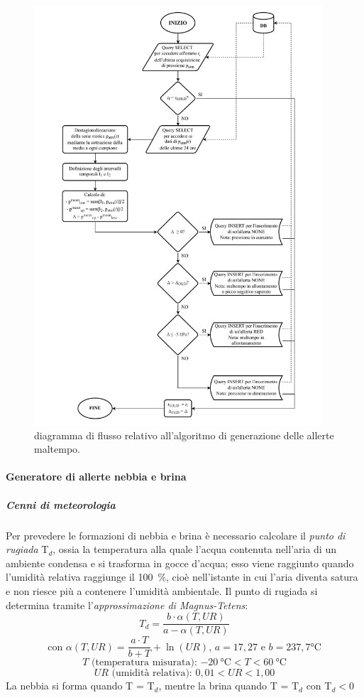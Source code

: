 \begin{figure}[h!]
	\centering
	\includegraphics[height=590px]{./Iterazione 3/OtherFiles/FC - Generatore allerte BW.pdf}
	\caption{diagramma di flusso relativo all'algoritmo di generazione delle allerte maltempo.}
	\label{fig:BFFlowChart}
\end{figure}

\clearpage

\paragraph{Generatore di allerte nebbia e brina}

\subparagraph{Cenni di meteorologia} Per prevedere le formazioni di nebbia e brina è necessario calcolare il \textit{punto di rugiada} T$_d$, ossia la temperatura alla quale l'acqua contenuta nell'aria di un ambiente condensa e si trasforma in gocce d'acqua; esso viene raggiunto quando l'umidità relativa raggiunge il \SI{100}{\percent}, cioè nell'istante in cui l'aria diventa satura e non riesce più a contenere l'umidità ambientale. Il punto di rugiada si determina tramite l'\textit{approssimazione di Magnus-Tetens}:
\[ T_d = \frac{b \cdot \alpha(T,UR)}{a - \alpha(T,UR)}\]
\[\mbox{con } \alpha(T,UR) = \frac{a \cdot T}{b + T} + \ln(UR) \mbox{, } a = \si{17,27} \mbox{ e } b = \si{237,7}\si{\degreeCelsius}\]
\[T\mbox{ (temperatura misurata): } \SI{-20}{\degreeCelsius} < T < \SI{60}{\degreeCelsius}\]
\[UR\mbox{ (umidità relativa): } 0,01 < UR < 1,00\]
La nebbia si forma quando T = T$_d$, mentre la brina quando T = T$_d$ con T$_d < 0$

